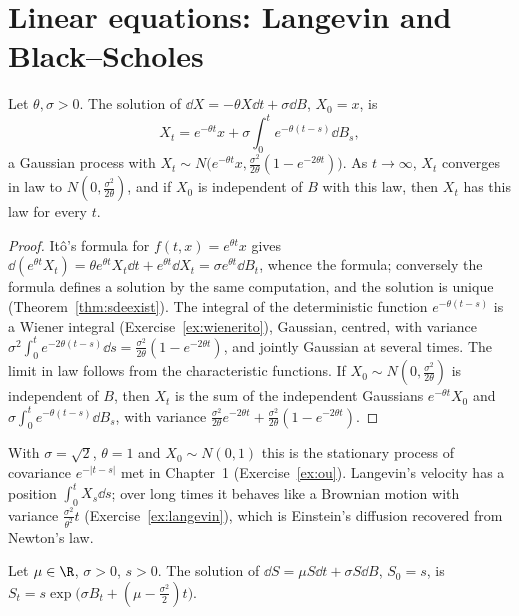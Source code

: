 \section{Linear equations: Langevin and Black--Scholes}

\begin{proposition}\label{prop:ou}
Let $\theta,\sigma>0$. The solution of $\dd X=-\theta X\dd t+\sigma\dd B$, $X_0=x$, is
\[
X_t=e^{-\theta t}x+\sigma\int_0^te^{-\theta(t-s)}\dd B_s ,
\]
a Gaussian process with $X_t\sim N\bigl(e^{-\theta t}x,\frac{\sigma^2}{2\theta}(1-e^{-2\theta t})\bigr)$. As $t\to\infty$, $X_t$ converges in law to $N(0,\frac{\sigma^2}{2\theta})$, and if $X_0$ is independent of $B$ with this law, then
$X_t$ has this law for every $t$.
\end{proposition}

\begin{proof}
It\^o's formula for $f(t,x)=e^{\theta t}x$ gives $\dd(e^{\theta t}X_t)=\theta e^{\theta t}X_t\dd t+e^{\theta t}\dd X_t=\sigma e^{\theta t}\dd B_t$, whence the formula; conversely the formula defines a solution by the same
computation, and the solution is unique (Theorem~\ref{thm:sdeexist}). The integral of the deterministic function $e^{-\theta(t-s)}$ is a Wiener integral (Exercise~\ref{ex:wienerito}), Gaussian, centred, with
variance $\sigma^2\int_0^te^{-2\theta(t-s)}\dd s=\frac{\sigma^2}{2\theta}(1-e^{-2\theta t})$, and jointly Gaussian at several times. The limit in law follows from the characteristic functions. If $X_0\sim N(0,\frac{\sigma^2}{2\theta})$ is
independent of $B$, then $X_t$ is the sum of the independent Gaussians $e^{-\theta t}X_0$ and $\sigma\int_0^te^{-\theta(t-s)}\dd B_s$, with variance $\frac{\sigma^2}{2\theta}e^{-2\theta t}+\frac{\sigma^2}{2\theta}(1-e^{-2\theta t})$.
\end{proof}

With $\sigma=\sqrt2$, $\theta=1$ and $X_0\sim N(0,1)$ this is the stationary process of covariance $e^{-|t-s|}$ met in Chapter~1 (Exercise~\ref{ex:ou}). Langevin's velocity has a position $\int_0^tX_s\dd s$; over long times it behaves like
a Brownian motion with variance $\frac{\sigma^2}{\theta^2}t$ (Exercise~\ref{ex:langevin}), which is Einstein's diffusion recovered from Newton's law.

\begin{proposition}\label{prop:gbm}
Let $\mu\in\R$, $\sigma>0$, $s>0$. The solution of $\dd S=\mu S\dd t+\sigma S\dd B$, $S_0=s$, is $S_t=s\exp\bigl(\sigma B_t+(\mu-\frac{\sigma^2}2)t\bigr)$.
\end{proposition}


